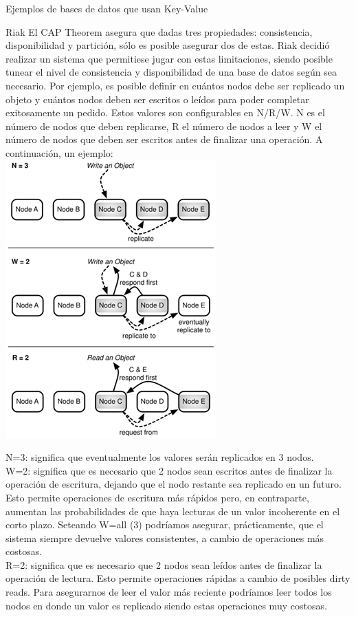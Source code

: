\begin{section}{Ejemplos de bases de datos que usan Key-Value}
\begin{subsection}{Riak}
El CAP Theorem asegura que dadas tres propiedades: consistencia, disponibilidad y partición, sólo es posible asegurar dos de estas. Riak decidió realizar un sistema que permitiese jugar con estas limitaciones, siendo posible tunear el nivel de consistencia y disponibilidad de una base de datos según sea necesario. Por ejemplo, es posible definir en cuántos nodos debe ser replicado un objeto y cuántos nodos deben ser escritos o leídos para poder completar exitosamente un pedido. Estos valores son configurables en N/R/W. N es el número de nodos que deben replicarse, R el número de nodos a leer y W el número de nodos que deben ser escritos antes de finalizar una operación. A continuación, un ejemplo:\\

\includegraphics[scale=1]{imgs/riak}

N=3: significa que eventualmente los valores serán replicados en 3 nodos. \\

W=2: significa que es necesario que 2 nodos sean escritos antes de finalizar la operación de escritura, dejando que el nodo restante sea replicado en un futuro. Esto permite operaciones de escritura más rápidos pero, en contraparte, aumentan las probabilidades de que haya lecturas de un valor incoherente en el corto plazo. Seteando W=all (3) podríamos asegurar, prácticamente, que el sistema siempre devuelve valores consistentes, a cambio de operaciones más costosas. \\

R=2: significa que es necesario que 2 nodos sean leídos antes de finalizar la operación de lectura. Esto permite operaciones rápidas a cambio de posibles dirty reads. Para asegurarnos de leer el valor más reciente podríamos leer todos los nodos en donde un valor es replicado siendo estas operaciones muy costosas.\\


\end{subsection}
\end{section}

